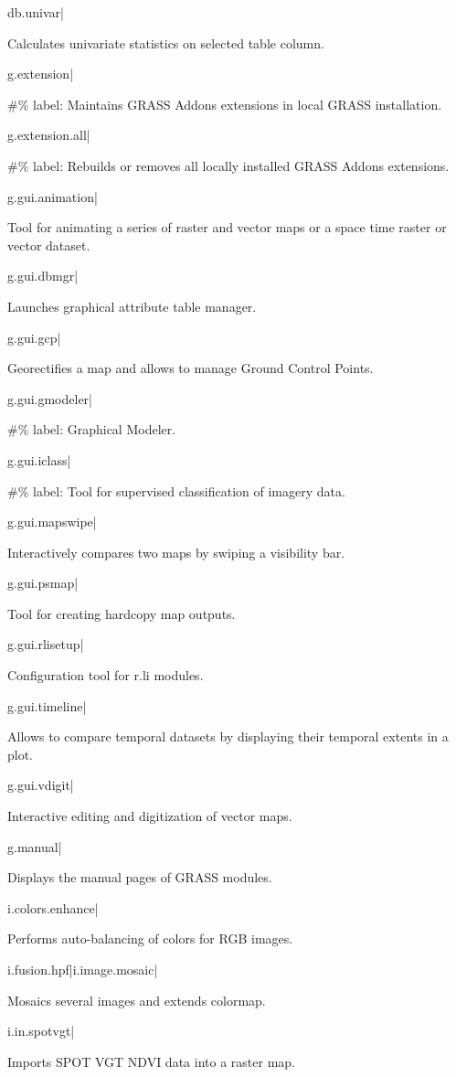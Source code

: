 db.univar|

Calculates univariate statistics on selected table column.

g.extension|

\#\% label: Maintains GRASS Addons extensions in local GRASS installation.

g.extension.all|

\#\% label: Rebuilds or removes all locally installed GRASS Addons
extensions.

g.gui.animation|

Tool for animating a series of raster and vector maps or a space time
raster or vector dataset.

g.gui.dbmgr|

Launches graphical attribute table manager.

g.gui.gcp|

Georectifies a map and allows to manage Ground Control Points.

g.gui.gmodeler|

\#\% label: Graphical Modeler.

g.gui.iclass|

\#\% label: Tool for supervised classification of imagery data.

g.gui.mapswipe|

Interactively compares two maps by swiping a visibility bar.

g.gui.psmap|

Tool for creating hardcopy map outputs.

g.gui.rlisetup|

Configuration tool for r.li modules.

g.gui.timeline|

Allows to compare temporal datasets by displaying their temporal extents
in a plot.

g.gui.vdigit|

Interactive editing and digitization of vector maps.

g.manual|

Displays the manual pages of GRASS modules.

i.colors.enhance|

Performs auto-balancing of colors for RGB images.

i.fusion.hpf|i.image.mosaic|

Mosaics several images and extends colormap.

i.in.spotvgt|

Imports SPOT VGT NDVI data into a raster map.

